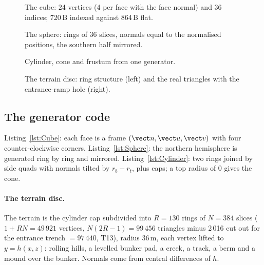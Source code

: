 \begin{figure}[h]
\centering
{}
\caption{}
\end{figure}
\begin{figure}[h]
\centering
{}
\caption{The cube: 24 vertices (4 per face with the face normal) and 36 indices; 720\,B indexed against 864\,B flat.}
\end{figure}
\begin{figure}[h]
\centering
{}
\caption{The sphere: rings of 36 slices, normals equal to the normalised positions, the southern half mirrored.}
\end{figure}
\begin{figure}[h]
\centering
{}
\caption{Cylinder, cone and frustum from one generator.}
\end{figure}
\begin{figure}[h]
\centering
{}
\caption{The terrain disc: ring structure (left) and the real triangles with the entrance-ramp hole (right).}
\end{figure}
\subsection{The generator code}
Listing~\ref{lst:Cube}: each face is a frame $(\vect n,\vect u,\vect v)$ with four counter-clockwise corners. Listing~\ref{lst:Sphere}: the northern hemisphere is generated ring by ring and mirrored. Listing~\ref{lst:Cylinder}: two rings joined by side quads with normals tilted by $r_b-r_t$, plus caps; a top radius of 0 gives the cone.
\lstCube
\lstSphere
\lstCylinder
\paragraph{The terrain disc.} The terrain is the cylinder cap subdivided into $R=130$ rings of $N=384$ slices ($1+RN=49\,921$ vertices, $N(2R-1)=99\,456$ triangles minus 2\,016 cut out for the entrance trench $=97\,440$, T13), radius 36\,m, each vertex lifted to
$y=h(x,z)$: rolling hills, a levelled bunker pad, a creek, a track, a berm and a mound over the bunker. Normals come from central differences of $h$.

